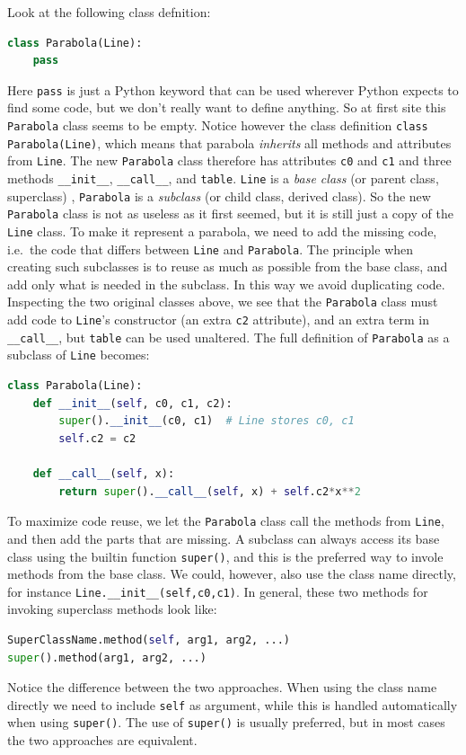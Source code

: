 \documentclass[graybox,envcountchap,sectrefs,final]{svmonodo}
\begin{document}
Look at the following class defnition:
\begin{lstlisting}[language=Python,style=blue1]
class Parabola(Line):
    pass
\end{lstlisting}
Here \texttt{pass} is just a Python keyword that can be used wherever Python expects to find some code, but we don't really want to define anything. So at
first site this \texttt{Parabola} class seems to be empty. Notice however the class definition \texttt{class Parabola(Line)}, which means that parabola \emph{inherits}
all methods and attributes from \texttt{Line}. The new \texttt{Parabola} class therefore has attributes \texttt{c0} and \texttt{c1} and three methods \Verb!__init__!, \Verb!__call__!, and
\texttt{table}. \texttt{Line} is a \emph{base class} (or parent class, superclass) , \texttt{Parabola} is a \emph{subclass}  (or child class, derived class). So the new \texttt{Parabola} class
is not as useless as it first seemed, but it is still just a copy of the \texttt{Line} class. To make it represent a parabola, we need to add the missing code,
i.e.~the code that differs between \texttt{Line} and \texttt{Parabola}. The principle when creating such subclasses is to reuse as much as possible from the base class,
and add only what is needed in the subclass. In this way we avoid duplicating code. Inspecting the two original classes above, we see that the
\texttt{Parabola} class must add code to \texttt{Line}'s constructor (an extra \texttt{c2} attribute), and an extra term in \Verb!__call__!, but \texttt{table} can be used unaltered.
The full definition of \texttt{Parabola} as a subclass of \texttt{Line} becomes:
\begin{lstlisting}[language=Python,style=blue1]
class Parabola(Line):
    def __init__(self, c0, c1, c2):
        super().__init__(c0, c1)  # Line stores c0, c1
        self.c2 = c2

    def __call__(self, x):
        return super().__call__(self, x) + self.c2*x**2
\end{lstlisting}
To maximize code reuse, we let the \texttt{Parabola} class call the methods from \texttt{Line}, and then add the parts that are missing. A subclass can always access
its base class using the builtin function \texttt{super()}, and this is the preferred way to invole methods from the base class. We could, however, also
use the class name directly, for instance \Verb!Line.__init__(self,c0,c1)!. In general, these two methods for invoking superclass methods look like:
\begin{lstlisting}[language=Python,style=blue1]
SuperClassName.method(self, arg1, arg2, ...)
super().method(arg1, arg2, ...)
\end{lstlisting}
Notice the difference between the two approaches. When using the class name directly we need to include \texttt{self} as argument, while this is handled
automatically when using \texttt{super()}. The use of \texttt{super()} is usually preferred, but in most cases the two approaches are equivalent.
\end{document}
